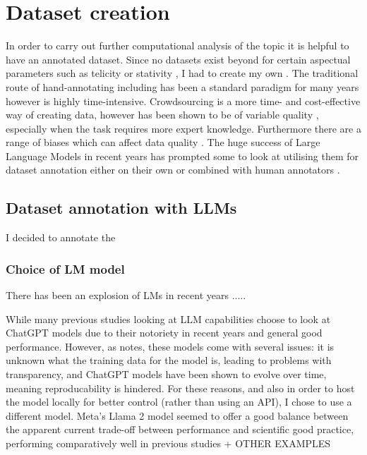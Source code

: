 \section{Dataset creation}
In order to carry out further computational analysis of the topic it is helpful to have an annotated dataset. Since no datasets exist beyond for certain aspectual parameters such as telicity \citep{friedrich-gateva-2017-classification} or stativity \citep{Friedrich2014AutomaticPO}, I had to create my own \citep{friedrich-etal-2023-kind}. The traditional route of hand-annotating including has been a standard paradigm for many years however is highly time-intensive. Crowdsourcing is a more time- and cost-effective way of creating data, however has been shown to be of variable quality \citep{li2024comparative}, especially when the task requires more expert knowledge. Furthermore there are a range of biases which can affect data quality \citep{Beck2023}. The huge success of Large Language Models in recent years has prompted some to look at utilising them for dataset annotation either on their own \citep{he2023annollm, llmsForPragAndDiscAnalysis, Gilardi_2023} or combined with human annotators \citep{goel2023llms}.

\subsection{Dataset annotation with LLMs}
I decided to annotate the 

\subsubsection*{Choice of LM model}
There has been an explosion of LMs in recent years .....

While many previous studies looking at LLM capabilities choose to look at ChatGPT models due to their notoriety in recent years and general good performance. However, as \citet{törnberg2024best} notes, these models come with several issues: it is unknown what the training data for the model is, leading to problems with transparency, and ChatGPT models have been shown to evolve over time, meaning reproducability is hindered. For these reasons, and also in order to host the model locally for better control (rather than using an API), I chose to use a different model. Meta's Llama 2 model seemed to offer a good balance between the apparent current trade-off between performance and scientific good practice, performing comparatively well in previous studies \citep{yuan2023futureTimeLlama} + OTHER EXAMPLES

